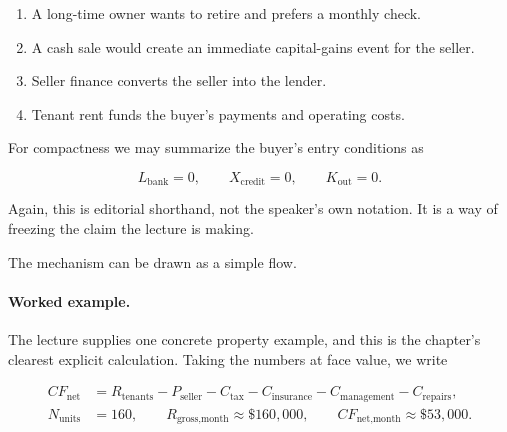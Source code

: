 \begin{enumerate}
\item A long-time owner wants to retire and prefers a monthly check.
\item A cash sale would create an immediate capital-gains event for the seller.
\item Seller finance converts the seller into the lender.
\item Tenant rent funds the buyer's payments and operating costs.
\end{enumerate}

For compactness we may summarize the buyer's entry conditions as

\begin{equation}
L_{\text{bank}}=0,
\qquad
X_{\text{credit}}=0,
\qquad
K_{\text{out}}=0.
\end{equation}

Again, this is editorial shorthand, not the speaker's own notation. It is a way of freezing the claim the lecture is making.

The mechanism can be drawn as a simple flow.

\begin{figure}
\centering
{}
\end{figure}

\paragraph{Worked example.} The lecture supplies one concrete property example, and this is the chapter's clearest explicit calculation. Taking the numbers at face value, we write

\begin{align}
CF_{\text{net}}
&=
R_{\text{tenants}}
-
P_{\text{seller}}
-
C_{\text{tax}}
-
C_{\text{insurance}}
-
C_{\text{management}}
-
C_{\text{repairs}},\\
N_{\text{units}}&=160,
\qquad
R_{\text{gross,month}}\approx \$160{,}000,
\qquad
CF_{\text{net,month}}\approx \$53{,}000.
\end{align}

